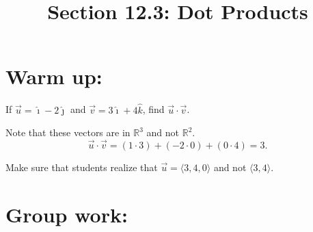 \documentclass[handout]{ximera}
\title{Section 12.3: Dot Products}
\begin{document}
\begin{abstract}		\end{abstract}
\maketitle


\section{Warm up:}

\begin{problem}
If $\vec{u} = \hat{\imath} - 2 \hat{\jmath}$ and $\vec{v} = 3 \hat{\imath} + 4 \hat{k}$, find $\vec{u} \cdot \vec{v}$.
	\begin{freeResponse}
	Note that these vectors are in $\mathbb{R}^3$ and not $\mathbb{R}^2$.
	\[
	\vec{u} \cdot \vec{v} = (1 \cdot 3) + (-2 \cdot 0) + (0 \cdot 4) = \boxed{3}.
	\]
	\end{freeResponse}
	
\begin{instructorNotes}
Make sure that students realize that $\vec{u} = \langle 3,4,0 \rangle$ and not $\langle 3,4 \rangle$.
\end{instructorNotes}

\end{problem}






\section{Group work:}
\end{document}
